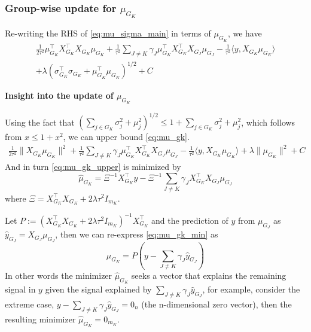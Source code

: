 \documentclass[12pt]{article}
\begin{document}
\subsubsection{Group-wise update for $\mu_{G_K}$}

Re-writing the RHS of \eqref{eq:mu_sigma_main} in terms of $\mu_{G_K}$, we have
\begin{equation} \label{eq:mu_gk}
\begin{aligned}
    \frac{1}{2\tau^2} 
    \mu_{G_K}^\top X_{G_K}^\top X_{G_K} \mu_{G_K}
+
    \frac{1}{\tau^2} 
    \sum_{J \neq K} 
	\gamma_J \mu_{G_K}^\top X_{G_K}^\top X_{G_J} \mu_{G_J} 
-
    \frac{1}{\tau^2}
    \langle y, X_{G_K} \mu_{G_K} \rangle \\
+
    \lambda \left( \sigma_{G_K}^\top \sigma_{G_K} + \mu_{G_K}^\top \mu_{G_K} \right)^{1/2} + C
\end{aligned}
\end{equation}

\textbf{Insight into the update of $\mu_{G_K}$}

Using the fact that $ \left( \sum_{j \in G_K} \sigma_j^2 + \mu_j^2 \right)^{1/2} \leq 1 + \sum_{j \in G_K} \sigma_j^2 + \mu_j^2 $, which follows from $x \leq 1 + x^2$, we can upper bound \eqref{eq:mu_gk}.
\begin{equation} \label{eq:mu_gk_upper}
\begin{aligned}
    \frac{1}{2\tau^2} 
    \| X_{G_K} \mu_{G_K} \|^2
+
    \frac{1}{\tau^2} 
    \sum_{J \neq K} 
	\gamma_J \mu_{G_K}^\top X_{G_K}^\top X_{G_J} \mu_{G_J} 
-
    \frac{1}{\tau^2}
    \langle y, X_{G_K} \mu_{G_K} \rangle
+
    \lambda \| \mu_{G_K} \|^2 + C
\end{aligned}
\end{equation}
And in turn \eqref{eq:mu_gk_upper} is minimized by
\begin{equation} \label{eq:mu_gk_min}
    \hat{\mu}_{G_K} = \Xi^{-1} X_{G_K}^\top y - \Xi^{-1} \sum_{J \neq K} \gamma_J X_{G_K}^\top X_{G_J} \mu_{G_J}    
\end{equation}
where $\Xi = X_{G_K}^\top X_{G_K} + 2 \lambda \tau^2 I_{m_K}$. 

Let $P := (X_{G_K}^\top X_{G_K} + 2 \lambda \tau^2 I_{m_K})^{-1} X_{G_K}^\top $ and the prediction of $y$ from $\mu_{G_J}$ as $\hat{y}_{G_J} = X_{G_J} \mu_{G_J}$, then we can re-express \eqref{eq:mu_gk_min} as
\begin{equation}
\hat{\mu}_{G_K} = P(y - \sum_{J \neq K} \gamma_J \hat{y}_{G_J})
\end{equation}
In other words the minimizer $\hat{\mu}_{G_K}$ seeks a vector that explains the remaining signal in $y$ given the signal explained by $\sum_{J \neq K} \gamma_J \hat{y}_{G_J}$, for example, consider the extreme case, $y - \sum_{J \neq K} \gamma_J \hat{y}_{G_J} = 0_n$ (the n-dimensional zero vector), then the resulting minimizer $\hat{\mu}_{G_K} = 0_{m_K}$. 
\end{document}
